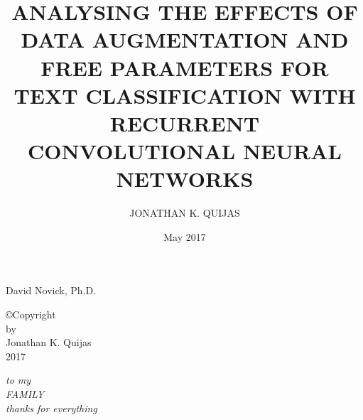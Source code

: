 \documentclass[12pt]{report}
\begin{document}
\graphicspath{{Diagrams/}}

\setcounter{tocdepth}{2}


\title{ANALYSING THE EFFECTS OF DATA AUGMENTATION AND FREE PARAMETERS FOR TEXT CLASSIFICATION WITH RECURRENT CONVOLUTIONAL NEURAL NETWORKS}

\author{JONATHAN K. QUIJAS}
\date{May 2017}

                 {David Novick, Ph.D.}


\makesigpage

\begin{CenteredPage}
\copyright Copyright\\[0.2in]
by\\[0.2in]
Jonathan K. Quijas\\[0.2in]
2017
\end{CenteredPage}

\begin{CenteredPage}
{\it to my\\[0.2in]
FAMILY\\[0.2in]
thanks for everything}
\end{CenteredPage}

\maketitlepage
\end{document}
